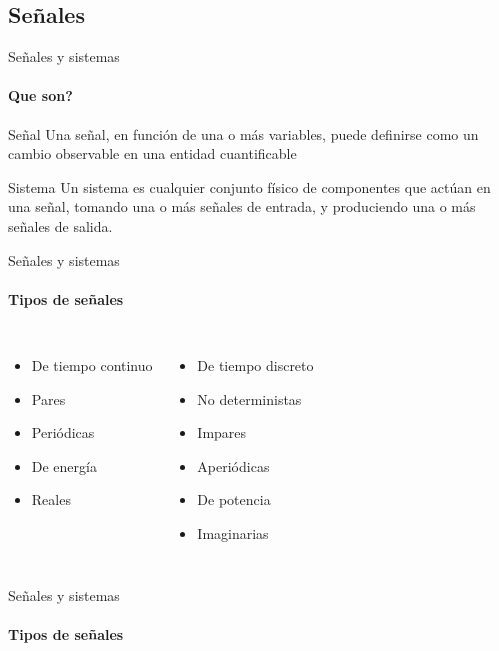 \documentclass{beamer}
\begin{document}
\begin{darkframes}
    \subsection{Señales}
    \begin{frame}{Señales y sistemas}
      \framesubtitle{Que son?}
      \begin{block}{Señal}
         Una señal, en función de una o más variables, puede definirse como un cambio observable en una entidad cuantificable
      \end{block}
      \begin{block}{Sistema}
         Un sistema es cualquier conjunto físico de componentes que actúan en una señal, tomando una o más señales de entrada, y produciendo una o más señales de salida.
      \end{block}
    \end{frame}
    \begin{frame}{Señales y sistemas}
      \framesubtitle{Tipos de señales}
      \begin{columns}[onlytextwidth]
            \begin{itemize}
               \item{De tiempo continuo}
               \item{Pares}
               \item{Periódicas}
               \item{De energía}
               \item{Reales}
            \end{itemize}
            \begin{itemize}
               \item{De tiempo discreto}
               \item{No deterministas}
               \item{Impares}
               \item{Aperiódicas}
               \item{De potencia}
               \item{Imaginarias}
            \end{itemize}
      \end{columns}
    \end{frame}
    \begin{frame}{Señales y sistemas}
      \framesubtitle{Tipos de señales}

\end{frame}
\end{darkframes}
\end{document}
